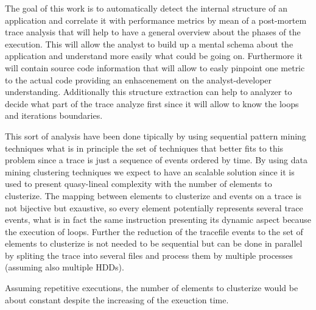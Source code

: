 The goal of this work is to automatically detect the internal structure of an 
application and correlate it with performance metrics by mean of a post-mortem 
trace analysis that will help to have a general overview about the phases of the 
execution. This will allow the analyst to build up a mental schema about the
application and understand more easily what could be going on. Furthermore it will 
contain source code information that will allow to easly pinpoint one metric to 
the actual code providing an enhacenement on the analyst-developer
understanding. Additionally this structure extraction can help to analyzer to 
decide what part of the trace analyze first since it will allow to know the loops 
and iterations boundaries.

This sort of analysis have been done tipically by using sequential pattern mining
techniques what is in principle the set of techniques that better fits to this
problem since a trace is just a sequence of events ordered by time.
By using data mining clustering techniques we expect to have an scalable
solution since it is used to present quasy-lineal complexity with the number of 
elements to clusterize. The mapping between elements to clusterize and events on
a trace is not bijective but exaustive, so every element potentially represents 
several trace events, what is in fact the same instruction presenting its dynamic
aspect because the execution of loops. Further the reduction of the tracefile
events to the set of elements to clusterize is not needed to be sequential but 
can be done in parallel by spliting the trace into several files and process
them by multiple processes (assuming also multiple HDDs). 

Assuming repetitive executions, the number of elements to clusterize would be 
about constant despite the increasing of the exeuction time.
